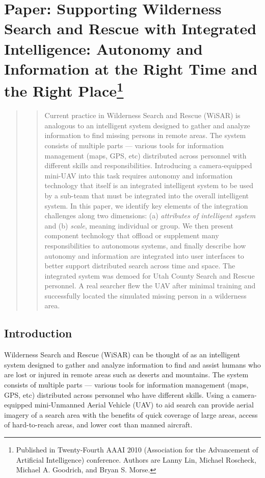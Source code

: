 \chapter[Paper: Supporting Wilderness Search and Rescue with Integrated Intelligence: Autonomy and Information at the Right Time and the Right Place]{Paper: Supporting Wilderness Search and Rescue with Integrated Intelligence: Autonomy and Information at the Right Time and the Right Place\footnote {Published in Twenty-Fourth AAAI 2010 (Association for the Advancement of Artificial Intelligence) conference. Authors are Lanny Lin, Michael Roscheck, Michael A. Goodrich, and Bryan S. Morse.}}
\label{chap:AAAI2010}

\begin{abstract}
\begin{quote}
Current practice in Wilderness Search and Rescue (WiSAR) is analogous to an intelligent system designed to gather and analyze information to find missing persons in remote areas. The system consists of multiple parts --- various tools for information management (maps, GPS, etc) distributed across personnel with different skills and responsibilities. Introducing a camera-equipped mini-UAV into this task requires autonomy and information technology that itself is an integrated intelligent system to be used by a sub-team that must be integrated into the overall intelligent system. In this paper, we identify key elements of the integration challenges along two dimensions: (a) \textit{attributes of intelligent system} and (b) \textit{scale}, meaning individual or group. We then present component technology that offload or supplement many responsibilities to autonomous systems, and finally describe how autonomy and information are integrated into user interfaces to better support distributed search across time and space. The integrated system was demoed for Utah County Search and Rescue personnel. A real searcher flew the UAV after minimal training and successfully located the simulated missing person in a wilderness area.
\end{quote}
\end{abstract}


\section{Introduction}
Wilderness Search and Rescue (WiSAR) can be thought of as an intelligent system designed to gather and analyze information to find and assist humans who are lost or injured in remote areas such as deserts and mountains. The system consists of multiple parts --- various tools for information management (maps, GPS, etc) distributed across personnel who have different skills. Using a camera-equipped mini-Unmanned Aerial Vehicle (UAV) to aid search can provide aerial imagery of a search area with the benefits of quick coverage of large areas, access of hard-to-reach areas, and lower cost than manned aircraft. 

